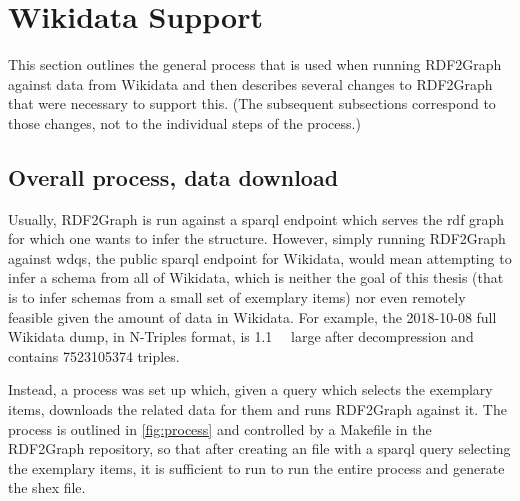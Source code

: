 \section{Wikidata Support}
\label{sec:RDF2Graph+Wikidata:Wikidata}

This section outlines the general process that is used when running \gls{RDF2Graph} against data from \gls{Wikidata}
and then describes several changes to \gls{RDF2Graph} that were necessary to support this.
(The subsequent subsections correspond to those changes, not to the individual steps of the process.)

\subsection{Overall process, data download}
\label{subsec:RDF2Graph+Wikidata:Wikidata:download}

Usually, \gls{RDF2Graph} is run against a \gls{sparql} endpoint
which serves the \gls{rdf} graph for which one wants to infer the structure.
However, simply running \gls{RDF2Graph} against \acrfull{wdqs}, the public \gls{sparql} endpoint for \gls{Wikidata},
would mean attempting to infer a \gls{schema} from all of \gls{Wikidata},
which is neither the goal of this thesis
(that is to infer \glspl{schema} from a small set of exemplary \glspl{item})
nor even remotely feasible given the amount of data in \gls{Wikidata}.
For example, the 2018-10-08 full \gls{Wikidata} dump, in \gls{N-Triples} format,
is \SI{1.1}{\tera\byte} large after decompression %
and contains \num{7523105374} triples.

Instead, a process was set up which,
given a query which selects the exemplary \glspl{item},
downloads the related data for them and runs \gls{RDF2Graph} against it.
The process is outlined in \cref{fig:process}
and controlled by a Makefile in the \gls{RDF2Graph} repository,
so that after creating an  file
with a \gls{sparql} query selecting the exemplary items,
it is sufficient to run 
to run the entire process and generate the \gls{shex} file.

